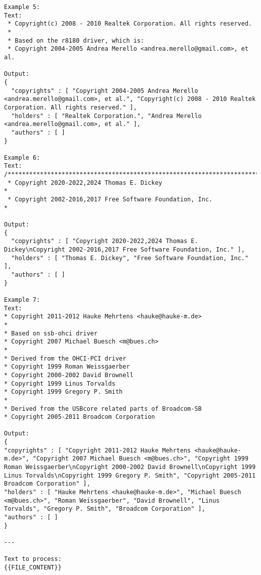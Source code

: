\begin{lstlisting}[keepspaces=true]
Example 5:
Text:
 * Copyright(c) 2008 - 2010 Realtek Corporation. All rights reserved.
 *
 * Based on the r8180 driver, which is:
 * Copyright 2004-2005 Andrea Merello <andrea.merello@gmail.com>, et al.

Output:
{
  "copyrights" : [ "Copyright 2004-2005 Andrea Merello <andrea.merello@gmail.com>, et al.", "Copyright(c) 2008 - 2010 Realtek Corporation. All rights reserved." ],
  "holders" : [ "Realtek Corporation.", "Andrea Merello <andrea.merello@gmail.com>, et al." ],
  "authors" : [ ]
}

Example 6:
Text:
/****************************************************************************
 * Copyright 2020-2022,2024 Thomas E. Dickey                                *
 * Copyright 2002-2016,2017 Free Software Foundation, Inc.                  *

Output:
{
  "copyrights" : [ "Copyright 2020-2022,2024 Thomas E. Dickey\nCopyright 2002-2016,2017 Free Software Foundation, Inc." ],
  "holders" : [ "Thomas E. Dickey", "Free Software Foundation, Inc." ],
  "authors" : [ ]
}

Example 7:
Text:
* Copyright 2011-2012 Hauke Mehrtens <hauke@hauke-m.de>
*
* Based on ssb-ohci driver
* Copyright 2007 Michael Buesch <m@bues.ch>
*
* Derived from the OHCI-PCI driver
* Copyright 1999 Roman Weissgaerber
* Copyright 2000-2002 David Brownell
* Copyright 1999 Linus Torvalds
* Copyright 1999 Gregory P. Smith
*
* Derived from the USBcore related parts of Broadcom-SB
* Copyright 2005-2011 Broadcom Corporation

Output:
{
"copyrights" : [ "Copyright 2011-2012 Hauke Mehrtens <hauke@hauke-m.de>", "Copyright 2007 Michael Buesch <m@bues.ch>", "Copyright 1999 Roman Weissgaerber\nCopyright 2000-2002 David Brownell\nCopyright 1999 Linus Torvalds\nCopyright 1999 Gregory P. Smith", "Copyright 2005-2011 Broadcom Corporation" ],
"holders" : [ "Hauke Mehrtens <hauke@hauke-m.de>", "Michael Buesch <m@bues.ch>", "Roman Weissgaerber", "David Brownell", "Linus Torvalds", "Gregory P. Smith", "Broadcom Corporation" ],
"authors" : [ ]
}

---

Text to process:
{{FILE_CONTENT}}
\end{lstlisting}